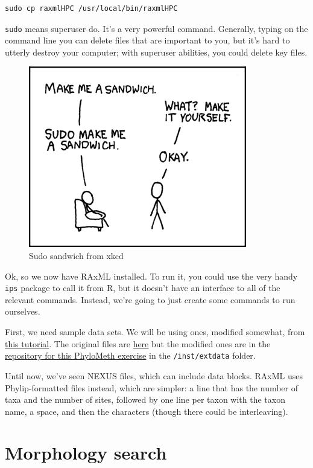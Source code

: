 \documentclass[]{book}
\theoremstyle{definition}
\theoremstyle{definition}
\theoremstyle{remark}
\begin{document}
\begin{verbatim}
sudo cp raxmlHPC /usr/local/bin/raxmlHPC
\end{verbatim}

\texttt{sudo} means superuser do. It's a very powerful command.
Generally, typing on the command line you can delete files that are
important to you, but it's hard to utterly destroy your computer; with
superuser abilities, you could delete key files.

\begin{figure}
\centering
\includegraphics{images/sandwich.png}
\caption{Sudo sandwich from xkcd}
\end{figure}

Ok, so we now have RAxML installed. To run it, you could use the very
handy \texttt{ips} package to call it from R, but it doesn't have an
interface to all of the relevant commands. Instead, we're going to just
create some commands to run ourselves.

First, we need sample data sets. We will be using ones, modified
somewhat, from
\href{http://sco.h-its.org/exelixis/web/software/raxml/hands_on.html}{this
tutorial}. The original files are
\href{http://sco.h-its.org/exelixis/resource/download/hands-on/Hands-On.tar.bz2}{here}
but the modified ones are in the
\href{https://github.com/PhyloMeth/LikelihoodTrees}{repository for this
PhyloMeth exercise} in the \texttt{/inst/extdata} folder.

Until now, we've seen NEXUS files, which can include data blocks. RAxML
uses Phylip-formatted files instead, which are simpler: a line that has
the number of taxa and the number of sites, followed by one line per
taxon with the taxon name, a space, and then the characters (though
there could be interleaving).

\section{Morphology search}\label{morphology-search}
\end{document}
